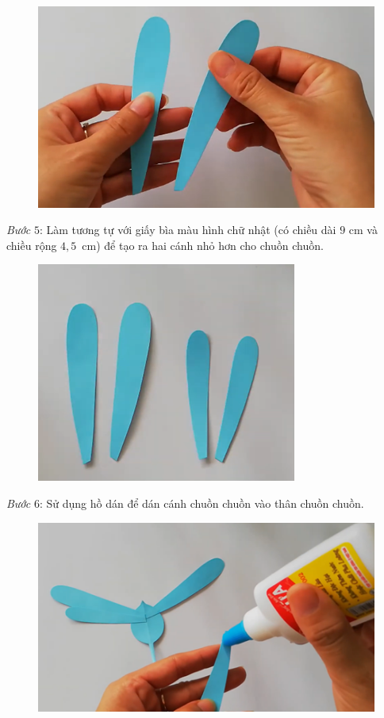 \begin{multicols}{2}
\begin{figure}[H]
		\vspace*{1pt}
		\includegraphics[width=0.7\linewidth]{71}
		\vspace*{-10pt}
	\end{figure}
	\textit{Bước} $5$: Làm tương tự với giấy bìa màu hình chữ nhật (có chiều dài $9$ cm và chiều rộng $4{,}5$~cm) để tạo ra hai cánh nhỏ hơn cho chuồn chuồn.
	\begin{figure}[H]
		\vspace*{-5pt}
		\centering
		\captionsetup{labelformat= empty, justification=centering}
		\includegraphics[width=0.7\linewidth]{72}
		\vspace*{-10pt}
	\end{figure}
	\textit{Bước} $6$: Sử dụng hồ dán để dán cánh chuồn chuồn vào thân chuồn chuồn.
	\begin{figure}[H]
		\vspace*{-5pt}
		\centering
		\captionsetup{labelformat= empty, justification=centering}
		\includegraphics[width=0.7\linewidth]{73}

\end{figure}
\end{multicols}
